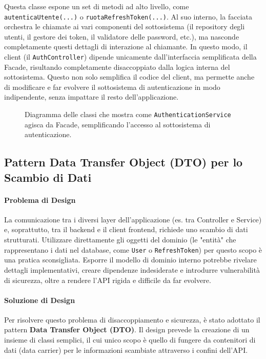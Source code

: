 \documentclass[12pt,a4paper,openright,twoside]{book}
\begin{document}
Questa classe espone un set di metodi ad alto livello, come \texttt{autenticaUtente(...)} o \texttt{ruotaRefreshToken(...)}. Al suo interno, la facciata orchestra le chiamate ai vari componenti del sottosistema (il repository degli utenti, il gestore dei token, il validatore delle password, etc.), ma nasconde completamente questi dettagli di interazione al chiamante. In questo modo, il client (il \texttt{AuthController}) dipende unicamente dall'interfaccia semplificata della Facade, risultando completamente disaccoppiato dalla logica interna del sottosistema. Questo non solo semplifica il codice del client, ma permette anche di modificare e far evolvere il sottosistema di autenticazione in modo indipendente, senza impattare il resto dell'applicazione.

\vspace{1cm}
\begin{figure}[h!]
    \centering
    \caption{Diagramma delle classi che mostra come \texttt{AuthenticationService} agisca da Facade, semplificando l'accesso al sottosistema di autenticazione.}
    \label{fig:facade_uml}
\end{figure}
\vspace{1cm}

\subsection{Pattern Data Transfer Object (DTO) per lo Scambio di Dati}
\label{subsec:design_dto}

\paragraph{Problema di Design}
La comunicazione tra i diversi layer dell'applicazione (es. tra Controller e Service) e, soprattutto, tra il backend e il client frontend, richiede uno scambio di dati strutturati. Utilizzare direttamente gli oggetti del dominio (le "entità" che rappresentano i dati nel database, come \texttt{User} o \texttt{RefreshToken}) per questo scopo è una pratica sconsigliata. Esporre il modello di dominio interno potrebbe rivelare dettagli implementativi, creare dipendenze indesiderate e introdurre vulnerabilità di sicurezza, oltre a rendere l'API rigida e difficile da far evolvere.

\paragraph{Soluzione di Design}
Per risolvere questo problema di disaccoppiamento e sicurezza, è stato adottato il pattern \textbf{Data Transfer Object (DTO)}. Il design prevede la creazione di un insieme di classi semplici, il cui unico scopo è quello di fungere da contenitori di dati (data carrier) per le informazioni scambiate attraverso i confini dell'API.
\end{document}
